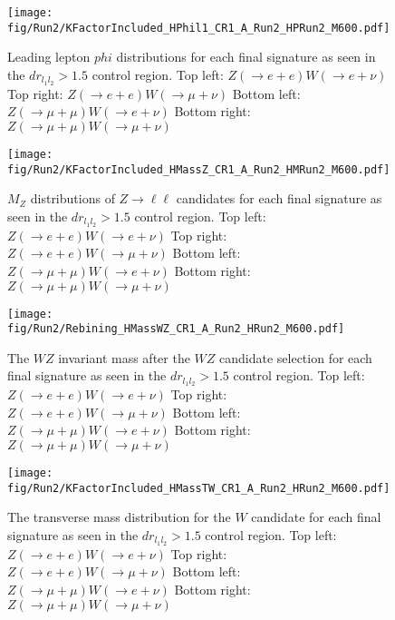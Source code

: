 \begin{figure}[tph]
  \centering
  \texttt{[image: fig/Run2/KFactorIncluded\_HPhil1\_CR1\_A\_Run2\_HPRun2\_M600.pdf]}
  \caption{Leading lepton $phi$ distributions for each final
    signature as seen in the $dr_{l_{1}l_{2}} > 1.5$ control region.
    Top left: $Z(\rightarrow e+e)W(\rightarrow e+\nu)$
    Top right: $Z(\rightarrow e+e)W(\rightarrow \mu+\nu)$
    Bottom left: $Z(\rightarrow \mu+\mu)W(\rightarrow e+\nu)$
    Bottom right: $Z(\rightarrow \mu+\mu)W(\rightarrow \mu+\nu)$}
  \label{fig:CR1_Run2_HPhil1}
\end{figure}

\begin{figure}[tph]
  \centering
  \texttt{[image: fig/Run2/KFactorIncluded\_HMassZ\_CR1\_A\_Run2\_HMRun2\_M600.pdf]}
  \caption{$M_{Z}$ distributions of $Z\rightarrow\ell\ell$ candidates for each final
    signature as seen in the $dr_{l_{1}l_{2}} > 1.5$ control region.
    Top left: $Z(\rightarrow e+e)W(\rightarrow e+\nu)$
    Top right: $Z(\rightarrow e+e)W(\rightarrow \mu+\nu)$
    Bottom left: $Z(\rightarrow \mu+\mu)W(\rightarrow e+\nu)$
    Bottom right: $Z(\rightarrow \mu+\mu)W(\rightarrow \mu+\nu)$}
  \label{fig:CR1_Run2_HMassZ}
\end{figure}

\begin{figure}[tph]
  \centering
  \texttt{[image: fig/Run2/Rebining\_HMassWZ\_CR1\_A\_Run2\_HRun2\_M600.pdf]}
  \caption{The $WZ$ invariant mass after the $WZ$ candidate selection for each final
    signature as seen in the $dr_{l_{1}l_{2}} > 1.5$ control region.
    Top left: $Z(\rightarrow e+e)W(\rightarrow e+\nu)$
    Top right: $Z(\rightarrow e+e)W(\rightarrow \mu+\nu)$
    Bottom left: $Z(\rightarrow \mu+\mu)W(\rightarrow e+\nu)$
    Bottom right: $Z(\rightarrow \mu+\mu)W(\rightarrow \mu+\nu)$}
  \label{fig:CR1_Run2_HMassWZ}
\end{figure}

\begin{figure}[tph]
  \centering
  \texttt{[image: fig/Run2/KFactorIncluded\_HMassTW\_CR1\_A\_Run2\_HRun2\_M600.pdf]}
  \caption{The transverse mass distribution for the $W$ candidate for each final
    signature as seen in the $dr_{l_{1}l_{2}} > 1.5$ control region.
    Top left: $Z(\rightarrow e+e)W(\rightarrow e+\nu)$
    Top right: $Z(\rightarrow e+e)W(\rightarrow \mu+\nu)$
    Bottom left: $Z(\rightarrow \mu+\mu)W(\rightarrow e+\nu)$
    Bottom right: $Z(\rightarrow \mu+\mu)W(\rightarrow \mu+\nu)$}
  \label{fig:CR1_Run2_HMassTW}
\end{figure}

